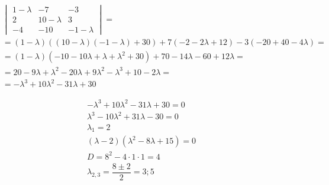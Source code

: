 \documentclass[12pt]{article}
\begin{document}
\begin{sloppypar}
    \begin{align*}
         & \begin{vmatrix}
               1 - \lambda & - 7          & -3           \\
               2           & 10 - \lambda & 3            \\
               -4          & -10          & -1 - \lambda
           \end{vmatrix} =                                                             \\
         & = (1 - \lambda)((10 - \lambda)(-1 - \lambda) + 30) + 7(-2 - 2\lambda + 12) - 3(-20 + 40 - 4\lambda) = \\
         & = (1 - \lambda)(-10 - 10\lambda + \lambda + \lambda^2 + 30) + 70 - 14\lambda - 60 + 12\lambda =       \\
         & = 20 - 9\lambda + \lambda^2 - 20\lambda + 9\lambda^2 - \lambda^3 + 10 - 2\lambda =                    \\
         & = -\lambda^3 + 10\lambda^2 - 31\lambda + 30
    \end{align*}

    \begin{align*}
        -\lambda^3 + 10\lambda^2 - 31\lambda + 30 = 0 \\
        \lambda^3 - 10\lambda^2 + 31\lambda - 30 = 0  \\
        \lambda_1 = 2                                 \\
        (\lambda - 2)(\lambda^2 - 8\lambda + 15) = 0  \\
        D = 8^2 - 4 \cdot 1 \cdot 1 = 4               \\
        \lambda_{2,3} = \dfrac{8 \pm 2}{2} = 3; 5
    \end{align*}


\end{sloppypar}
\end{document}
